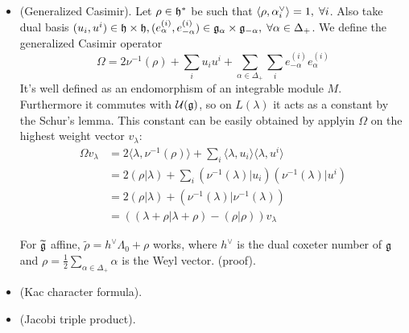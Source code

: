 \begin{itemize}
    \item(Generalized Casimir).
    Let $\rho\in\mathfrak{h}^*$ be such that $\langle\rho,\alpha^{\vee}_i\rangle=1,\;\forall i$. Also take dual basis 
    $(u_i,u^i)\in\mathfrak{h}\times\mathfrak{h}, (e_\alpha^{(i)},e_{-\alpha}^{(i)})
    \in\mathfrak{g}_{\alpha}\times\mathfrak{g}_{-\alpha},\;\forall\alpha\in\Delta_+$. We define the generalized Casimir operator
    \begin{equation}
        \Omega = 2\nu^{-1}(\rho) +\sum_iu_iu^i +\sum_{\alpha\in\Delta_+}\sum_ie_{-\alpha}^{(i)}e_{\alpha}^{(i)}
    \end{equation}
    It's well defined as an endomorphism of an integrable module $M$. Furthermore it commutes with $\mathcal{U}(\mathfrak{g})$, so 
    on $L(\lambda)$ it acts as a constant by the Schur's lemma. This constant can be easily obtained by applyin $\Omega$
    on the highest weight vector $v_\lambda$:
    \begin{equation}
        \begin{split}
            \Omega v_\lambda &= 2\langle\lambda,\nu^{-1}(\rho)\rangle 
            + \sum_i\langle\lambda,u_i\rangle\langle\lambda,u^i\rangle\\
            &= 2(\rho|\lambda)+\sum_i(\nu^{-1}(\lambda)|u_i)(\nu^{-1}(\lambda)|u^i)\\
            &=2(\rho|\lambda)+(\nu^{-1}(\lambda)|\nu^{-1}(\lambda))\\
            &=((\lambda+\rho|\lambda+\rho)-(\rho|\rho))v_\lambda
        \end{split}
    \end{equation}
    \begin{example}
        For $\widetilde{\mathfrak{g}}$ affine, $\widetilde{\rho} = h^\vee \Lambda_0 + \rho$ works, where $h^\vee$ is the dual coxeter number 
        of $\mathfrak{g}$ and $\rho=\tfrac12\sum_{\alpha\in\Delta_+}\alpha$ is the Weyl vector. (\TODO proof).
     \end{example}
    \item(Kac character formula).
    \item(Jacobi triple product).
\end{itemize}

